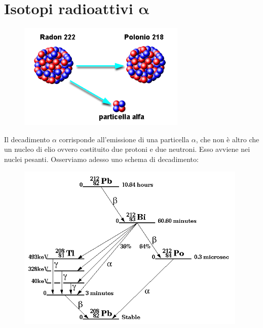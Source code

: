 \section[Isotopi radioattivi \texorpdfstring{$\alpha$}{\textalpha}]
{Isotopi radioattivi $\boldsymbol{\alpha}$}

\vspace{-0.6cm}\begin{figure}[H]
    \centering
    \includegraphics[width=8cm]{immagini/decadimento_alfa.png}
\end{figure}

\vspace{-0.2cm}Il decadimento $\alpha$ corrisponde all'emissione di una particella $\alpha$, che non è altro che un nucleo di elio ovvero costituito due protoni e due neutroni. Esso avviene nei nuclei pesanti. Osserviamo adesso uno schema di decadimento:

\begin{figure}[H]
    \centering
    \includegraphics[width=11cm]{immagini/schema_decadimento_alfa.png}
\end{figure}

